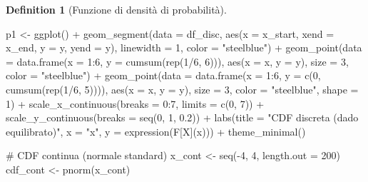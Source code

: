 \documentclass[
  letterpaper,
  DIV=11,
  numbers=noendperiod,
  oneside]{scrreprt}
\newenvironment{Shaded}{\begin{snugshade}}{\end{snugshade}}
\newcommand{\AttributeTok}[1]{\textcolor[rgb]{0.40,0.45,0.13}{#1}}
\newcommand{\CommentTok}[1]{\textcolor[rgb]{0.37,0.37,0.37}{#1}}
\newcommand{\DecValTok}[1]{\textcolor[rgb]{0.68,0.00,0.00}{#1}}
\newcommand{\FloatTok}[1]{\textcolor[rgb]{0.68,0.00,0.00}{#1}}
\newcommand{\FunctionTok}[1]{\textcolor[rgb]{0.28,0.35,0.67}{#1}}
\newcommand{\NormalTok}[1]{\textcolor[rgb]{0.00,0.23,0.31}{#1}}
\newcommand{\OtherTok}[1]{\textcolor[rgb]{0.00,0.23,0.31}{#1}}
\newcommand{\SpecialCharTok}[1]{\textcolor[rgb]{0.37,0.37,0.37}{#1}}
\newcommand{\StringTok}[1]{\textcolor[rgb]{0.13,0.47,0.30}{#1}}
\theoremstyle{definition}
\theoremstyle{plain}
\theoremstyle{definition}
\newtheorem{definition}{Definition}[chapter]
\theoremstyle{remark}
\begin{document}
\begin{definition}[Funzione di densità di
probabilità]
\begin{Shaded}
\begin{Highlighting}[]
\NormalTok{p1 }\OtherTok{\textless{}{-}} \FunctionTok{ggplot}\NormalTok{() }\SpecialCharTok{+}
  \FunctionTok{geom\_segment}\NormalTok{(}\AttributeTok{data =}\NormalTok{ df\_disc, }\FunctionTok{aes}\NormalTok{(}\AttributeTok{x =}\NormalTok{ x\_start, }\AttributeTok{xend =}\NormalTok{ x\_end, }\AttributeTok{y =}\NormalTok{ y, }\AttributeTok{yend =}\NormalTok{ y),}
               \AttributeTok{linewidth =} \DecValTok{1}\NormalTok{, }\AttributeTok{color =} \StringTok{"steelblue"}\NormalTok{) }\SpecialCharTok{+}
  \FunctionTok{geom\_point}\NormalTok{(}\AttributeTok{data =} \FunctionTok{data.frame}\NormalTok{(}\AttributeTok{x =} \DecValTok{1}\SpecialCharTok{:}\DecValTok{6}\NormalTok{, }\AttributeTok{y =} \FunctionTok{cumsum}\NormalTok{(}\FunctionTok{rep}\NormalTok{(}\DecValTok{1}\SpecialCharTok{/}\DecValTok{6}\NormalTok{, }\DecValTok{6}\NormalTok{))),}
             \FunctionTok{aes}\NormalTok{(}\AttributeTok{x =}\NormalTok{ x, }\AttributeTok{y =}\NormalTok{ y), }\AttributeTok{size =} \DecValTok{3}\NormalTok{, }\AttributeTok{color =} \StringTok{"steelblue"}\NormalTok{) }\SpecialCharTok{+}
  \FunctionTok{geom\_point}\NormalTok{(}\AttributeTok{data =} \FunctionTok{data.frame}\NormalTok{(}\AttributeTok{x =} \DecValTok{1}\SpecialCharTok{:}\DecValTok{6}\NormalTok{, }\AttributeTok{y =} \FunctionTok{c}\NormalTok{(}\DecValTok{0}\NormalTok{, }\FunctionTok{cumsum}\NormalTok{(}\FunctionTok{rep}\NormalTok{(}\DecValTok{1}\SpecialCharTok{/}\DecValTok{6}\NormalTok{, }\DecValTok{5}\NormalTok{)))),}
             \FunctionTok{aes}\NormalTok{(}\AttributeTok{x =}\NormalTok{ x, }\AttributeTok{y =}\NormalTok{ y), }\AttributeTok{size =} \DecValTok{3}\NormalTok{, }\AttributeTok{color =} \StringTok{"steelblue"}\NormalTok{, }\AttributeTok{shape =} \DecValTok{1}\NormalTok{) }\SpecialCharTok{+}
  \FunctionTok{scale\_x\_continuous}\NormalTok{(}\AttributeTok{breaks =} \DecValTok{0}\SpecialCharTok{:}\DecValTok{7}\NormalTok{, }\AttributeTok{limits =} \FunctionTok{c}\NormalTok{(}\DecValTok{0}\NormalTok{, }\DecValTok{7}\NormalTok{)) }\SpecialCharTok{+}
  \FunctionTok{scale\_y\_continuous}\NormalTok{(}\AttributeTok{breaks =} \FunctionTok{seq}\NormalTok{(}\DecValTok{0}\NormalTok{, }\DecValTok{1}\NormalTok{, }\FloatTok{0.2}\NormalTok{)) }\SpecialCharTok{+}
  \FunctionTok{labs}\NormalTok{(}\AttributeTok{title =} \StringTok{"CDF discreta (dado equilibrato)"}\NormalTok{, }
       \AttributeTok{x =} \StringTok{"x"}\NormalTok{, }\AttributeTok{y =} \FunctionTok{expression}\NormalTok{(F[X](x))) }\SpecialCharTok{+}
  \FunctionTok{theme\_minimal}\NormalTok{()}

\CommentTok{\# CDF continua (normale standard)}
\NormalTok{x\_cont }\OtherTok{\textless{}{-}} \FunctionTok{seq}\NormalTok{(}\SpecialCharTok{{-}}\DecValTok{4}\NormalTok{, }\DecValTok{4}\NormalTok{, }\AttributeTok{length.out =} \DecValTok{200}\NormalTok{)}
\NormalTok{cdf\_cont }\OtherTok{\textless{}{-}} \FunctionTok{pnorm}\NormalTok{(x\_cont)}


\end{Highlighting}
\end{Shaded}
\end{definition}
\end{document}
